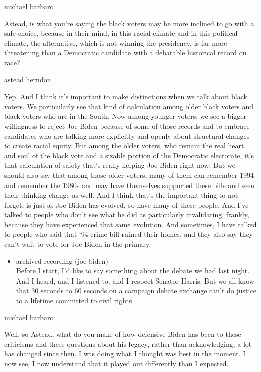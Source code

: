 michael barbaro

Astead, is what you're saying the black voters may be more inclined to
go with a safe choice, because in their mind, in this racial climate and
in this political climate, the alternative, which is not winning the
presidency, is far more threatening than a Democratic candidate with a
debatable historical record on race?

astead herndon

Yep. And I think it's important to make distinctions when we talk about
black voters. We particularly see that kind of calculation among older
black voters and black voters who are in the South. Now among younger
voters, we see a bigger willingness to reject Joe Biden because of some
of those records and to embrace candidates who are talking more
explicitly and openly about structural changes to create racial equity.
But among the older voters, who remain the real heart and soul of the
black vote and a sizable portion of the Democratic electorate, it's that
calculation of safety that's really helping Joe Biden right now. But we
should also say that among those older voters, many of them can remember
1994 and remember the 1980s and may have themselves supported these
bills and seen their thinking change as well. And I think that's the
important thing to not forget, is just as Joe Biden has evolved, so have
many of these people. And I've talked to people who don't see what he
did as particularly invalidating, frankly, because they have experienced
that same evolution. And sometimes, I have talked to people who said
that `94 crime bill ruined their homes, and they also say they can't
wait to vote for Joe Biden in the primary.

\begin{itemize}
\tightlist
\item
  archived recording (joe biden)\\
  Before I start, I'd like to say something about the debate we had last
  night. And I heard, and I listened to, and I respect Senator Harris.
  But we all know that 30 seconds to 60 seconds on a campaign debate
  exchange can't do justice to a lifetime committed to civil rights.
\end{itemize}

michael barbaro

Well, so Astead, what do you make of how defensive Biden has been to
these criticisms and these questions about his legacy, rather than
acknowledging, a lot has changed since then. I was doing what I thought
was best in the moment. I now see, I now understand that it played out
differently than I expected.

